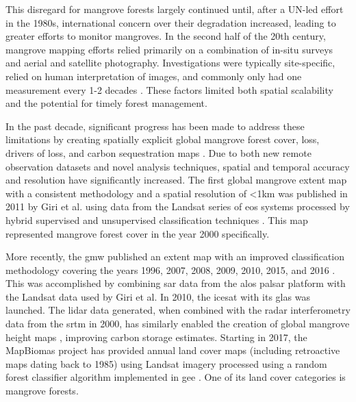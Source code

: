 This disregard for mangrove forests largely continued until, after a UN-led effort in the 1980s, international concern over their degradation increased, leading to greater efforts to monitor mangroves. In the second half of the 20th century, mangrove mapping efforts relied primarily on a combination of in-situ surveys and aerial and satellite photography. Investigations were typically site-specific, relied on human interpretation of images, and commonly only had one measurement every 1-2 decades \cite{lacerdaluizandmenezesmarceloandmussimolisanimauricioChangesMangroveExtension2007, fromardHalfCenturyDynamic2004}. These factors limited both spatial scalability and the potential for timely forest management. 


In the past decade, significant progress has been made to address these limitations by creating spatially explicit global mangrove forest cover, loss, drivers of loss, and carbon sequestration maps \cite{spaldingWorldAtlasMangroves2010, donatoMangrovesMostCarbonrich2011, sandermanGlobalMapMangrove2018, simardMangroveCanopyHeight2019, goldbergGlobalDeclinesHuman2020}. Due to both new remote observation datasets and novel analysis techniques, spatial and temporal accuracy and resolution have significantly increased. The first global mangrove extent map with a consistent methodology and a spatial resolution of <1km was published in 2011 by Giri et al. using data from the Landsat series of \acp{eo} systems processed by hybrid supervised and unsupervised classification techniques \cite{giriStatusDistributionMangrove2011}. This map represented mangrove forest cover in the year 2000 specifically. 

More recently, the \ac{gmw} published an extent map with an improved classification methodology covering the years 1996, 2007, 2008, 2009, 2010, 2015, and 2016 \cite{buntingGlobalMangroveWatch2018}. This was accomplished by combining \ac{sar} data from the \ac{alos} \ac{palsar} platform with the Landsat data used by Giri et al. In 2010, the \ac{icesat} with its \ac{glas} was launched. The lidar data generated, when combined with the radar interferometry data from the \ac{srtm} in 2000, has similarly enabled the creation of global mangrove height maps \cite{simardMangroveCanopyHeight2019}, improving carbon storage estimates. Starting in 2017, the MapBiomas project has provided annual land cover maps (including retroactive maps dating back to 1985) using Landsat imagery processed using a random forest classifier algorithm implemented in \ac{gee} \cite{raisg-mapbiomasconsortiumMapBiomasAmazoniaProject2021}. One of its land cover categories is mangrove forests. 

